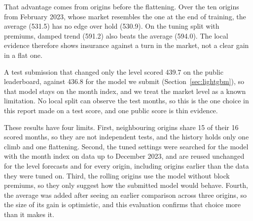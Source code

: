 That advantage comes from origins before the flattening. Over the ten origins from
February 2023, whose market resembles the one at the end of training, the average
(531.5) has no edge over hold (530.9). On the tuning split with premiums, damped
trend (591.2) also beats the average (594.0). The local evidence therefore shows
insurance against a turn in the market, not a clear gain in a flat one.

A test submission that changed only the level scored 439.7 on the public leaderboard, against 436.8 for the model
we submit (Section~\ref{sec:lightgbm}), so that model stays on the month index, and we treat the
market level as a known limitation. No local split can observe the test months,
so this is the one choice in this report made on a test score, and one public
score is thin evidence.

These results have four limits. First, neighbouring origins share 15 of their
16 scored months, so they are not independent tests, and the history holds only
one climb and one flattening. Second, the tuned settings were searched for the
model with the month index on data up to December 2023, and are reused
unchanged for the level forecasts and for every origin, including origins
earlier than the data they were tuned on. Third, the rolling origins use the
model without block premiums, so they only suggest how the submitted model would
behave. Fourth, the average was added after seeing an earlier comparison across
three origins, so the size of its gain is optimistic, and this evaluation confirms
that choice more than it makes it.
